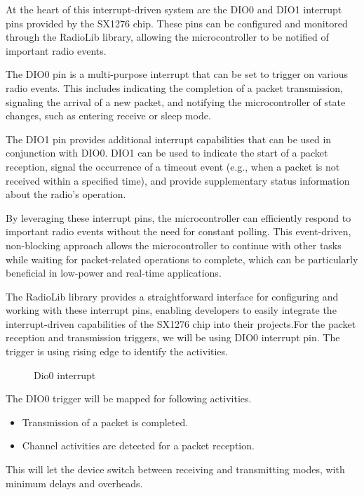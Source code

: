 At the heart of this interrupt-driven system are the DIO0 and DIO1 interrupt pins provided by the SX1276 chip. These pins can be configured and monitored through the RadioLib library, allowing the microcontroller to be notified of important radio events.

The DIO0 pin is a multi-purpose interrupt that can be set to trigger on various radio events. This includes indicating the completion of a packet transmission, signaling the arrival of a new packet, and notifying the microcontroller of state changes, such as entering receive or sleep mode.

The DIO1 pin provides additional interrupt capabilities that can be used in conjunction with DIO0. DIO1 can be used to indicate the start of a packet reception, signal the occurrence of a timeout event (e.g., when a packet is not received within a specified time), and provide supplementary status information about the radio's operation.

By leveraging these interrupt pins, the microcontroller can efficiently respond to important radio events without the need for constant polling. This event-driven, non-blocking approach allows the microcontroller to continue with other tasks while waiting for packet-related operations to complete, which can be particularly beneficial in low-power and real-time applications.

The RadioLib library provides a straightforward interface for configuring and working with these interrupt pins, enabling developers to easily integrate the interrupt-driven capabilities of the SX1276 chip into their projects.For the packet reception and transmission triggers, we will be using DIO0 interrupt pin. The trigger is using rising edge to identify the activities.\\

\begin{figure}
    \centering
    
    \caption{Dio0 interrupt}
    \label{fig:intrpt}
\end{figure}

The DIO0 trigger will be mapped for following activities.
\begin{itemize}
    \item Transmission of a packet is completed.
    \item Channel activities are detected for a packet reception.
\end{itemize}

This will let the device switch between receiving and transmitting modes, with minimum delays and overheads.

